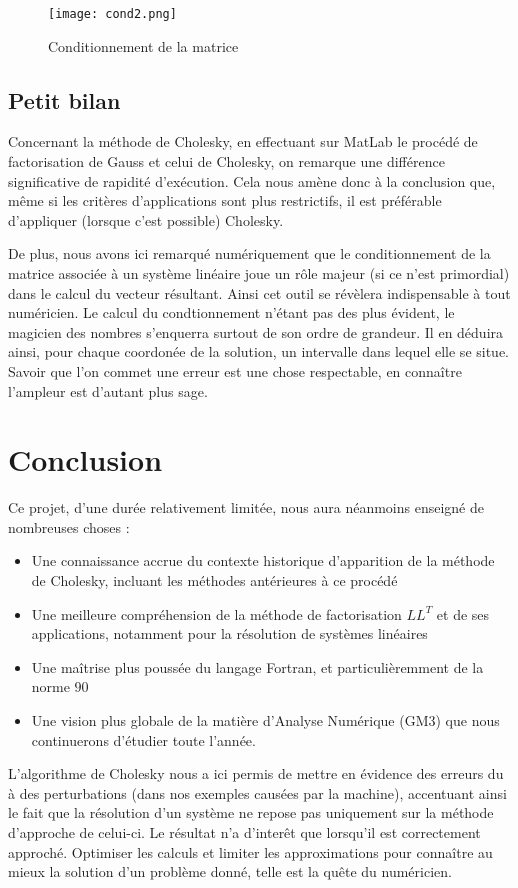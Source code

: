 \documentclass[a4paper, titlepage]{livret}													%
\begin{document}
		\begin{figure}[!ht]
			\centering
  				\texttt{[image: cond2.png]}
  				\caption{Conditionnement de la matrice}
		\end{figure}

	\section{Petit bilan}
		Concernant la méthode de Cholesky, en effectuant sur MatLab le procédé de factorisation de Gauss et celui de Cholesky, on remarque une différence significative de rapidité d'exécution.
		Cela nous amène donc à la conclusion que, même si les critères d'applications sont plus restrictifs, il est préférable d'appliquer (lorsque c'est possible) Cholesky.

		De plus, nous avons ici remarqué numériquement que le conditionnement de la matrice associée à un système linéaire joue un rôle majeur (si ce n'est primordial) dans le calcul du vecteur résultant.
		Ainsi cet outil se révèlera indispensable à tout numéricien.
		Le calcul du condtionnement n'étant pas des plus évident, le \og magicien des nombres \fg{} s'enquerra surtout de son ordre de grandeur.
		Il en déduira ainsi, pour chaque coordonée de la solution, un intervalle dans lequel elle se situe.
		Savoir que l'on commet une erreur est une chose respectable, en connaître l'ampleur est d'autant plus sage.
		

\chapter*{Conclusion}
	Ce projet, d'une durée relativement limitée, nous aura néanmoins enseigné de nombreuses choses :
	\begin{itemize}
		\item Une connaissance accrue du contexte historique d'apparition de la méthode de Cholesky, incluant les méthodes antérieures à ce procédé
		\item Une meilleure compréhension de la méthode de factorisation $LL^{T}$ et de ses applications, notamment pour la résolution de systèmes linéaires
		\item Une maîtrise plus poussée du langage Fortran, et particulièremment de la norme $90$
		\item Une vision plus globale de la matière d'Analyse Numérique (GM3) que nous continuerons d'étudier toute l'année.
	\end{itemize}
	L'algorithme de Cholesky nous a ici permis de mettre en évidence des erreurs du à des \og perturbations \fg{} (dans nos exemples causées par la machine), accentuant ainsi le fait que la résolution d'un système ne repose pas uniquement sur la méthode d'approche de celui-ci.
	Le résultat n'a d'interêt que lorsqu'il est correctement approché. 
	Optimiser les calculs et limiter les approximations pour connaître au mieux la solution d'un problème donné, telle est la quête du numéricien.
\end{document}
